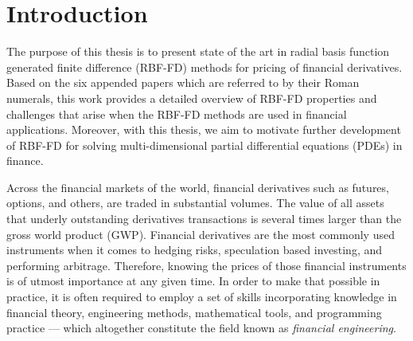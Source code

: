 \documentclass{UUThesisTemplate}
\begin{document}
    \begingroup
        \tableofcontents
    \endgroup

\mainmatter
%    
%    
%    

%    
%
%





%
\chapter{Introduction}
\label{ch:introduction}

\par
The purpose of this thesis is to present state of the art in radial basis function generated finite difference (RBF-FD) methods for pricing of financial derivatives. Based on the six appended papers which are referred to by their Roman numerals, this work provides a detailed overview of RBF-FD properties and challenges that arise when the RBF-FD methods are used in financial applications. Moreover, with this thesis, we aim to motivate further development of RBF-FD for solving multi-dimensional partial differential equations (PDEs) in finance.

\par
Across the financial markets of the world, financial derivatives such as futures, options, and others, are traded in substantial volumes. The value of all assets that underly outstanding derivatives transactions is several times larger than the gross world product (GWP). Financial derivatives are the most commonly used instruments when it comes to hedging risks, speculation based investing, and performing arbitrage. Therefore, knowing the prices of those financial instruments is of utmost importance at any given time. In order to make that possible in practice, it is often required to employ a set of skills incorporating knowledge in financial theory, engineering methods, mathematical tools, and programming practice --- which altogether constitute the field known as \emph{financial engineering}. 
\end{document}
